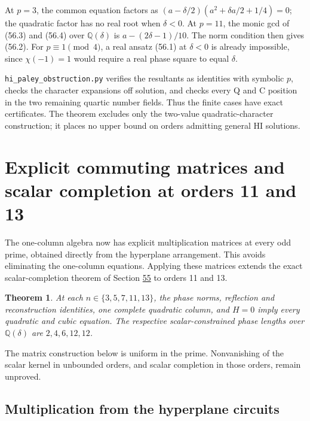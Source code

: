 \documentclass[11pt,reqno]{amsart}
\theoremstyle{plain}
\newtheorem{theorem}{Theorem}[section]
\begin{document}
At \(p=3\), the common equation factors as
\((a-\delta/2)(a^2+\delta a/2+1/4)=0\); the quadratic factor
has no real root when \(\delta<0\). At \(p=11\), the monic gcd
of (56.3) and (56.4) over \(\mathbb Q(\delta)\) is
\(a-(2\delta-1)/10\). The norm condition then gives (56.2).
For \(p\equiv1\pmod4\), a real ansatz (56.1) at \(\delta<0\)
is already impossible, since \(\chi(-1)=1\) would require a real
phase square to equal \(\delta\).

\texttt{hi\_\allowbreak paley\_\allowbreak obstruction.py} verifies the resultants as identities with
symbolic \(p\), checks the character expansions off solution, and
checks every Q and C position in the two remaining quartic number
fields. Thus the finite cases have exact certificates. The theorem
excludes only the two-value quadratic-character construction; it places
no upper bound on orders admitting general HI solutions.

\section{Explicit commuting matrices and scalar completion at orders 11 and 13}\label{sec:57}

The one-column algebra now has explicit multiplication matrices at every
odd prime, obtained directly from the hyperplane arrangement. This avoids
eliminating the one-column equations. Applying these matrices extends the
exact scalar-completion theorem of Section \hyperref[sec:55]{55} to orders 11 and 13.

\begin{theorem}
At each \(n\in\{3,5,7,11,13\}\), the phase norms,
reflection and reconstruction identities, one complete quadratic column,
and \(H=0\) imply every quadratic and cubic equation. The respective
scalar-constrained phase lengths over \(\mathbb Q(\delta)\) are
\(2,4,6,12,12\).
\end{theorem}

The matrix construction below is uniform in the prime. Nonvanishing of
the scalar kernel in unbounded orders, and scalar completion in those
orders, remain unproved.

\subsection{Multiplication from the hyperplane circuits}\label{sec:57.1}
\end{document}
